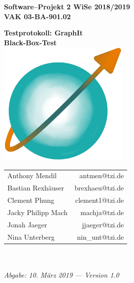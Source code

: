 \documentclass[enabledeprecatedfontcommands]{scrartcl}
\begin{document}
\thispagestyle{fancy}
\fancyhead[LO,RE]{ }
\fancyfoot[C]{}
\vspace{3cm}

\begin{minipage}[H]{\textwidth}
	\begin{center}
		\bf
		\Large
		Software--Projekt 2 WiSe 2018/2019\\
		\smallskip
		\small
		VAK 03-BA-901.02\\
		\vspace{3cm}
	\end{center}
\end{minipage}
\begin{minipage}[H]{\textwidth}
	\begin{center}
		\vspace{1cm}
		\bf
		\Large Testprotokoll: GraphIt\\
		Black-Box-Test\\
		\vspace{1cm}
		\includegraphics[width=2.5in]{logo_graphit.png}		
	\end{center}	
\end{minipage}
\vfill
\begin{minipage}[H]{\textwidth}
	\begin{center}
		\sf
		\begin{tabular}{lr}
			Anthony Mendil & antmen@tzi.de \\
			Bastian Rexhäuser & brexhaeu@tzi.de\\
			Clement Phung & clement1@tzi.de \\
			Jacky Philipp Mach & machja@tzi.de \\
			Jonah Jaeger & jjaeger@tzi.de \\
			Nina Unterberg & nin\_unt@tzi.de \\
		\end{tabular}
		\\ ~
		\vspace{2cm}
		\\
		\it Abgabe: 10. März 2019 --- Version 1.0\\ ~
	\end{center}
\end{minipage}
\end{document}

